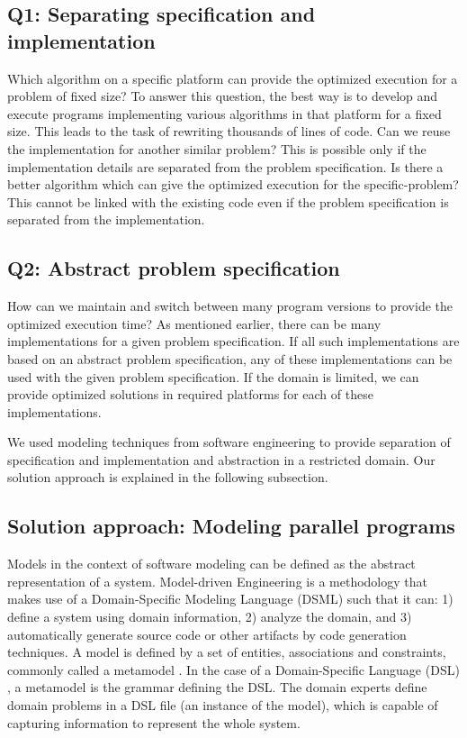 \documentclass[draftclsnofoot]{elsarticle}
\begin{document}
\subsection{Q1: Separating specification and implementation}
\label{sec_q1}
Which algorithm on a specific platform can provide the optimized execution for a problem of fixed size?
To answer this question, the best way is to  develop and execute programs  implementing various algorithms in that platform for a fixed size. This leads to the task of rewriting thousands 
of lines of code. Can we reuse the implementation for another similar problem? This is possible only if the implementation details are separated from the problem specification.
Is there a better algorithm which can give the optimized execution for the specific-problem? This cannot be
linked with the existing code even if the problem specification is separated from the implementation. 

\subsection{Q2: Abstract problem specification} 
\label{sec_q2}
How can we maintain and switch between many program versions to provide the optimized execution time?
As mentioned earlier, there can be many implementations for a given problem specification. If all such implementations are based on an abstract problem specification, any of these
implementations can be used with the given problem specification. If the domain is limited, we can provide optimized solutions in required platforms for each of these implementations.

We used modeling techniques from software engineering to provide separation of specification and implementation and abstraction in a restricted domain. Our solution approach is
explained in the following subsection.  

\subsection{Solution approach: Modeling parallel programs}
 

Models in the context of software modeling can be defined as the abstract representation of a system. Model-driven Engineering \cite{modeldriven} is a methodology that makes use 
of a Domain-Specific Modeling Language (DSML) \cite{ds1,dsml} such that it can: 1) define a system using domain information, 2) analyze the domain, and 3) automatically generate  
source code or other artifacts by code generation techniques. A model is defined by a set of 
entities, associations and constraints, commonly called a metamodel \cite{modeldriven1}. In the case of a Domain-Specific Language (DSL) \cite{dsl}, a metamodel is the grammar defining 
the DSL. The domain experts define domain problems in a DSL file (an instance of the model), which is capable of capturing information to represent the whole system.
\end{document}
